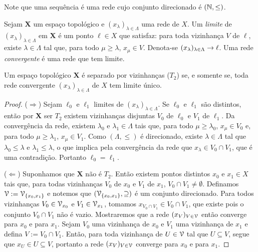 Note que uma sequência é uma rede cujo conjunto direcionado é $(\mathbb{N},\leq)$.

\begin{definition}
Sejam $\bm X$ um espaço topológico e $(x_\lambda)_{\lambda \in \Lambda}$ uma rede de $X$. Um \emph{limite} de $(x_\lambda)_{\lambda \in \Lambda}$ em $\bm X$ é um ponto $\ell \in X$ que satisfaz: para toda vizinhança $V$ de $\ell$, existe $\lambda \in \Lambda$ tal que, para todo $\mu \geq \lambda$, $x_\mu \in V$. Denota-se $(x_\lambda)_{\lambda \in \Lambda} \rightarrow \ell$. Uma rede \emph{convergente} é uma rede que tem limite.
\end{definition}

\begin{proposition}
Um espaço topológico $\bm X$ é separado por vizinhanças ($T_2$)  se, e somente se, toda rede convergente $(x_\lambda)_{\lambda \in \Lambda}$ de $X$ tem limite único.
\end{proposition}
\begin{proof}
($\Rightarrow$) Sejam $\ell_0$ e $\ell_1$ limites de $(x_\lambda)_{\lambda \in \Lambda}$. Se $\ell_0$ e $\ell_1$ são distintos, então por $\bm X$ ser $T_2$ existem vizinhanças disjuntas $V_0$ de $\ell_0$ e $V_1$ de $\ell_1$. Da convergência da rede, existem $\lambda_0$ e $\lambda_1 \in \Lambda$ tais que, para todo $\mu\geq \lambda_0$, $x_\mu \in V_0$ e, para todo $\mu \geq \lambda_1$, $x_\mu \in V_1$. Como $(\Lambda,\leq)$ é direcionado, existe $\lambda \in \Lambda$ tal que $\lambda_0 \leq \lambda$ e $\lambda_1 \leq \lambda$, o que implica pela convergência da rede que $x_\lambda \in V_0 \cap V_1$, que é uma contradição. Portanto $\ell_0=\ell_1$.

($\Leftarrow$) Suponhamos que $\bm X$ não é $T_2$. Então existem pontos distintos $x_0$ e $x_1 \in X$ tais que, para todas vizinhanças $V_0$ de $x_0$ e $V_1$ de $x_1$, $V_0 \cap V_1 \neq \emptyset$. Definamos $\mathcal{V} := \mathcal{V}_{\{x_0,x_1\}}$ e notemos que $(\mathcal{V}_{\{x_0,x_1\}},\supseteq)$ é um conjunto direcionado. Para todos vizinhanças $V_0 \in \mathcal{V}_{x_0}$ e $V_1 \in \mathcal{V}_{x_1}$, tomamos $x_{V_0 \cap V_1} \in V_0 \cap V_1$, que existe pois o conjunto $V_0 \cap V_1$ não é vazio. Mostraremos que a rede $(x_V)_{V \in \mathcal{V}}$ então converge para $x_0$ e para $x_1$. Sejam $V_0$ uma vizinhança de $x_0$ e $V_1$ uma vizinhança de $x_1$ e defina $V := V_0 \cap V_1$. Então, para toda vizinhança de $U \in \mathcal{V}$ tal que $U \subseteq V$, segue que $x_U \in U \subseteq V$, portanto a rede $(x_V)_{V \in \mathcal{V}}$  converge para $x_0$ e para $x_1$.
\end{proof}

